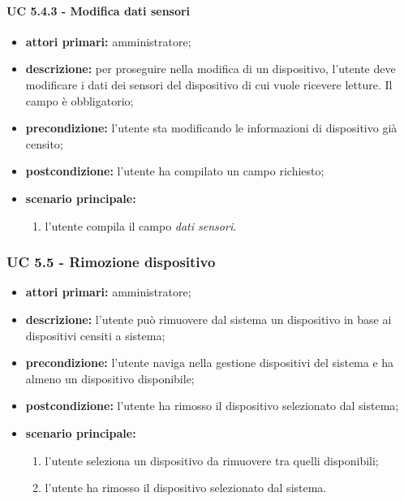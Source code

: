 				\paragraph{UC 5.4.3 - Modifica dati sensori}
				\begin{itemize}
					\item \textbf{attori primari:} amministratore;
					\item \textbf{descrizione:} per proseguire nella modifica di un dispositivo, l'utente deve modificare i dati dei sensori del dispositivo di cui vuole ricevere letture. Il campo è obbligatorio;
					\item \textbf{precondizione:} l'utente sta modificando le informazioni di dispositivo già censito;
					\item \textbf{postcondizione:} l'utente ha compilato un campo richiesto;
					\item \textbf{scenario principale:}
					\begin{enumerate}
						\item{l'utente compila il campo \textit{dati sensori}.}
					\end{enumerate}
				\end{itemize}

			\subsubsection{UC 5.5 - Rimozione dispositivo}
			\begin{itemize}
				\item \textbf{attori primari:} amministratore;
				\item \textbf{descrizione:} l'utente può rimuovere dal sistema un dispositivo in base ai dispositivi censiti a sistema;
				\item \textbf{precondizione:} l'utente naviga nella gestione dispositivi del sistema e ha almeno un dispositivo disponibile;
				\item \textbf{postcondizione:} l'utente ha rimosso il dispositivo selezionato dal sistema;
				\item \textbf{scenario principale:}
				\begin{enumerate}
					\item{l'utente seleziona un dispositivo da rimuovere tra quelli disponibili;}
					\item{l'utente ha rimosso il dispositivo selezionato dal sistema.}
				\end{enumerate}
			\end{itemize}

